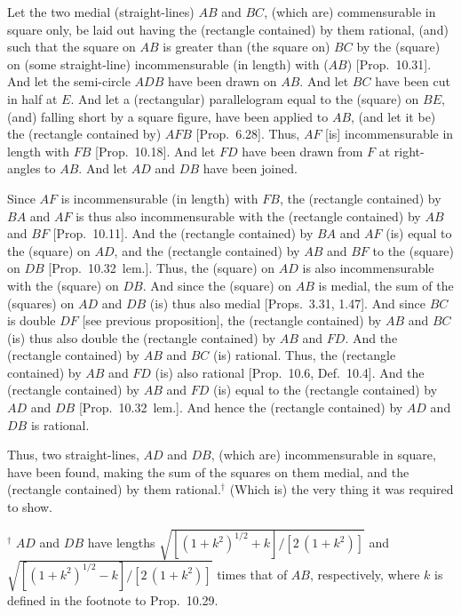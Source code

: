 \begin{Parallel}{}{}
{
\centerline{}

Let the two medial (straight-lines) $AB$ and $BC$,
(which are) commensurable in square only, be laid out having the
(rectangle contained) by them rational, (and) such that the square on
$AB$ is greater than (the square on) $BC$ by the (square) on (some straight-line)
incommensurable (in length) with ($AB$) [Prop.~10.31].
And let the semi-circle $ADB$ have been drawn on $AB$.
And let $BC$ have been cut in half at $E$. And let a (rectangular) parallelogram
equal to the (square) on $BE$, (and) falling short by a square figure,
have been applied to $AB$, (and let it be) the (rectangle
contained by) $AFB$ [Prop.~6.28].
Thus, $AF$ [is] incommensurable in length with $FB$
[Prop.~10.18]. And let 
$FD$ have been drawn from $F$ at right-angles to $AB$.
And let $AD$ and $DB$ have been joined.

Since $AF$ is incommensurable (in length) with $FB$, the (rectangle contained) by
$BA$ and $AF$ is thus also incommensurable with the (rectangle contained)
by $AB$ and $BF$ [Prop.~10.11].  And the
(rectangle contained) by $BA$ and $AF$ (is) equal to the (square) on $AD$, and the (rectangle contained) by $AB$ and $BF$ to the (square) on $DB$
[Prop.~10.32~lem.]. Thus, the (square) on
$AD$ is also incommensurable with the (square) on $DB$. And
since the (square) on $AB$ is medial, the sum of the (squares) on
$AD$ and $DB$ (is) thus also medial [Props.~3.31, 1.47]. And since $BC$ is double $DF$ [see previous proposition], the (rectangle
contained) by $AB$ and $BC$ (is) thus also double the (rectangle contained)
by $AB$ and $FD$. And the (rectangle contained) by $AB$ and $BC$ (is)
rational. Thus, the (rectangle contained) by $AB$ and $FD$
(is) also rational [Prop.~10.6, Def.~10.4]. And the (rectangle contained) by
$AB$ and $FD$ (is) equal to the (rectangle contained) by $AD$ and $DB$
[Prop.~10.32~lem.]. And hence the (rectangle
contained) by $AD$ and $DB$ is rational.

Thus, two straight-lines, $AD$ and $DB$, (which are) incommensurable
in square, have been found, making the sum of the squares on them medial,
and the (rectangle contained) by them rational.$^\dag$
(Which is) the very thing
it was required to show.}
\end{Parallel}
{\footnotesize\noindent$^\dag$ $AD$ and $DB$ have lengths $\sqrt{[(1+k^2)^{1/2}+k]/[2\,(1+k^2)]}$
and  $\sqrt{[(1+k^2)^{1/2}-k]/[2\,(1+k^2)]}$ times that of $AB$, respectively, where $k$ is defined in the footnote
to Prop.~10.29.}

